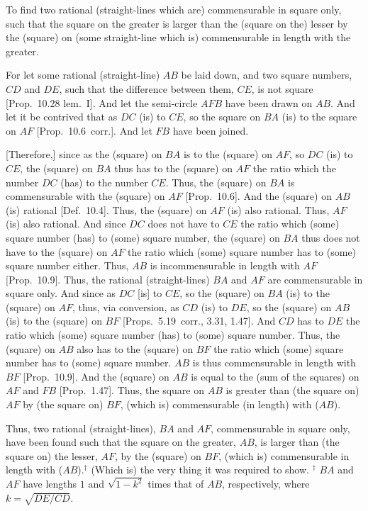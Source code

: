 To  find two rational (straight-lines which are)
commensurable in square only, such that the square on the greater is larger
than the (square on the) lesser by the (square) on (some straight-line which is) commensurable in length with the greater.

\epsfysize=1.7in
\centerline{}

For let some rational (straight-line) $AB$ be laid down, and two
square numbers, $CD$ and $DE$, such that the difference between them, $CE$, is not square [Prop.~10.28 lem.~I]. 
And let the semi-circle $AFB$ have been drawn on $AB$. And let
it be contrived that as $DC$ (is) to $CE$, so the square on $BA$
(is) to the square on $AF$ [Prop.~10.6~corr.].
And let $FB$ have been joined.

\mbox{[}Therefore,] since as the (square) on $BA$ is to the (square) on $AF$,
so $DC$ (is) to $CE$, the (square) on $BA$ thus has to the (square)
on $AF$ the ratio which the number $DC$ (has) to the number $CE$.
Thus, the (square) on $BA$ is commensurable with the (square) on $AF$
[Prop.~10.6]. And the (square) on $AB$ (is)
rational [Def.~10.4]. Thus, the (square) on $AF$
(is) also rational. Thus, $AF$ (is) also rational. 
And since $DC$ does not have to $CE$ the ratio which
(some) square number (has) to (some) square number,  the (square)
on $BA$ thus does not have to the (square) on $AF$ the ratio which (some)
square number has to (some) square number either. Thus, $AB$ is incommensurable in length with $AF$ [Prop.~10.9].
Thus, the rational (straight-lines) $BA$
and $AF$ are commensurable in square only. And since as $DC$ [is] to $CE$, so the
(square) on $BA$ (is) to the (square) on $AF$, thus, via conversion,
as $CD$ (is) to $DE$, so the (square) on $AB$ (is) to the (square) on
$BF$ [Props.~5.19~corr., 3.31, 1.47]. And $CD$
has to $DE$ the ratio which (some) square number (has) to (some)
square number. Thus, the (square) on $AB$ also has to the (square) on
$BF$ the ratio which (some) square number has to (some) square number.
$AB$ is thus commensurable in length with $BF$ [Prop.~10.9]. And the (square) on $AB$
is equal to the (sum of the squares) on $AF$ and $FB$ [Prop.~1.47]. Thus, the
square on $AB$ is greater than (the square on) $AF$ by (the square on)
$BF$, (which is) commensurable (in length) with ($AB$).

Thus, two rational (straight-lines), $BA$ and $AF$, commensurable in square only, have been found such that the square on the greater, $AB$, is larger
than (the square on) the lesser, $AF$, by the (square) on $BF$, (which is)
commensurable in length with ($AB$).$^\dag$ (Which is) the very thing it
was required to show.
{\footnotesize\noindent$^\dag$ $BA$ and $AF$
have lengths $1$ and $\sqrt{1-k^2}$ times that of $AB$, respectively, where $k=\sqrt{DE/CD}$.}

